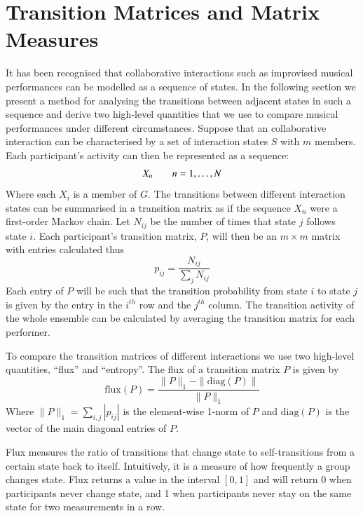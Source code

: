 \documentclass{sigchi}
\begin{document}
\section{Transition Matrices and Matrix Measures}

It has been recognised that collaborative interactions such as
improvised musical performances can be modelled as a sequence of
states. In the following section we present a method for analysing the
transitions between adjacent states in such a sequence and derive two
high-level quantities that we use to compare musical performances
under different circumstances. Suppose that an collaborative
interaction can be characterised by a set of interaction states $S$
with $m$ members.
Each participant's activity can then be represented as a sequence:
\begin{equation}
 X_n \hskip 2em n = 1, \ldots, N
\end{equation}
Where each $X_i$ is a member of $G$. The transitions between different
interaction states can be summarised in a transition matrix as if the
sequence $X_n$ were a first-order Markov chain. Let $N_{ij}$ be the
number of times that state $j$ follows state $i$. Each participant's
transition matrix, $P$, will then be an $m \times m$ matrix with
entries calculated thus
\begin{equation}
  p_{ij} = \frac{N_{ij}}{\sum_j N_{ij}}
\end{equation}
Each entry of $P$ will be such that the transition probability from
state $i$ to state $j$ is given by the entry in the $i^{th}$ row and
the $j^{th}$ column. The transition activity of the whole ensemble can
be calculated by averaging the transition matrix for each performer.

To compare the transition matrices of different interactions we use
two high-level quantities, ``flux'' and ``entropy''. The flux of a
transition matrix $P$ is given by
\begin{equation}
  \mathrm{flux}(P) = \frac{\|P\|_1-\|\mathrm{diag}(P)\|}{\|P\|_1}
\end{equation}
Where $\|P\|_1 = \sum_{i,j}|p_{ij}|$ is the element-wise 1-norm of $P$
and $\mathrm{diag}(P)$ is the vector of the main diagonal entries of
$P$.

Flux measures the ratio of transitions that change
state to self-transitions from a certain state back to itself.
Intuitively, it is a measure of how frequently a group changes state. Flux
returns a value in the interval $[0,1]$ and will return 0 when
participants never change state, and 1 when participants never stay on
the same state for two measurements in a row.
\end{document}
